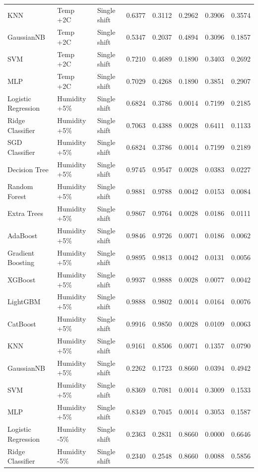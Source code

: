 \begin{tabular}{lllrrrrr}
KNN & Temp +2C & Single shift & 0.6377 & 0.3112 & 0.2962 & 0.3906 & 0.3574 \\
GaussianNB & Temp +2C & Single shift & 0.5347 & 0.2037 & 0.4894 & 0.3096 & 0.1857 \\
SVM & Temp +2C & Single shift & 0.7210 & 0.4689 & 0.1890 & 0.3403 & 0.2692 \\
MLP & Temp +2C & Single shift & 0.7029 & 0.4268 & 0.1890 & 0.3851 & 0.2907 \\
Logistic Regression & Humidity +5\% & Single shift & 0.6824 & 0.3786 & 0.0014 & 0.7199 & 0.2185 \\
Ridge Classifier & Humidity +5\% & Single shift & 0.7063 & 0.4388 & 0.0028 & 0.6411 & 0.1133 \\
SGD Classifier & Humidity +5\% & Single shift & 0.6824 & 0.3786 & 0.0014 & 0.7199 & 0.2189 \\
Decision Tree & Humidity +5\% & Single shift & 0.9745 & 0.9547 & 0.0028 & 0.0383 & 0.0227 \\
Random Forest & Humidity +5\% & Single shift & 0.9881 & 0.9788 & 0.0042 & 0.0153 & 0.0084 \\
Extra Trees & Humidity +5\% & Single shift & 0.9867 & 0.9764 & 0.0028 & 0.0186 & 0.0111 \\
AdaBoost & Humidity +5\% & Single shift & 0.9846 & 0.9726 & 0.0071 & 0.0186 & 0.0062 \\
Gradient Boosting & Humidity +5\% & Single shift & 0.9895 & 0.9813 & 0.0042 & 0.0131 & 0.0056 \\
XGBoost & Humidity +5\% & Single shift & 0.9937 & 0.9888 & 0.0028 & 0.0077 & 0.0042 \\
LightGBM & Humidity +5\% & Single shift & 0.9888 & 0.9802 & 0.0014 & 0.0164 & 0.0076 \\
CatBoost & Humidity +5\% & Single shift & 0.9916 & 0.9850 & 0.0028 & 0.0109 & 0.0063 \\
KNN & Humidity +5\% & Single shift & 0.9161 & 0.8506 & 0.0071 & 0.1357 & 0.0790 \\
GaussianNB & Humidity +5\% & Single shift & 0.2262 & 0.1723 & 0.8660 & 0.0394 & 0.4942 \\
SVM & Humidity +5\% & Single shift & 0.8369 & 0.7081 & 0.0014 & 0.3009 & 0.1533 \\
MLP & Humidity +5\% & Single shift & 0.8349 & 0.7045 & 0.0014 & 0.3053 & 0.1587 \\
Logistic Regression & Humidity -5\% & Single shift & 0.2363 & 0.2831 & 0.8660 & 0.0000 & 0.6646 \\
Ridge Classifier & Humidity -5\% & Single shift & 0.2340 & 0.2548 & 0.8660 & 0.0088 & 0.5856 \\

\end{tabular}
